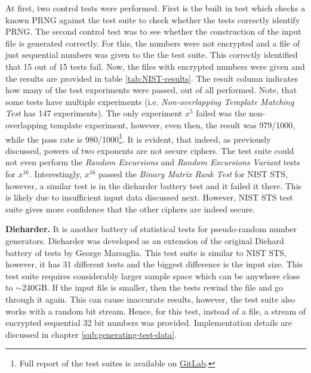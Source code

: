\documentclass{Resources/UoBLab1}
\theoremstyle{definition}
\begin{document}
At first, two control tests were performed. First is the built in test which checks a known PRNG against the test suite to check whether the tests correctly identify PRNG. The second control test was to see whether the construction of the input file is generated correctly. For this, the numbers were not encrypted and a file of just sequential numbers was given to the the test suite. This correctly identified that 15 out of 15 tests fail. Now, the files with encrypted numbers were given and the results are provided in table \ref{tab:NIST-results}. The result column indicates how many of the test experiments were passed, out of all performed. Note, that some tests have multiple experiments (i.e. \textit{Non-overlapping Template Matching Test} has 147 experiments). The only experiment $x^5$ failed was the non-overlapping template experiment, however, even then, the result was 979/1000, while the pass rate is 980/1000\footnote{Full report of the test suites is available on \href{https://git.cs.bham.ac.uk/projects-2023-24/sxt063/-/tree/main/test-suite-results}{GitLab}.}. It is evident, that indeed, as previously discussed, powers of two exponents are not secure ciphers. The test suite could not even perform the \textit{Random Excursions} and \textit{Random Excursions Variant} tests for $x^{16}$. Interestingly, $x^{16}$ passed the \textit{Binary Matrix Rank Test} for NIST STS, however, a similar test is in the dieharder battery test and it failed it there. This is likely due to insufficient input data discussed next. However, NIST STS test suite gives more confidence that the other ciphers are indeed secure.\medskip

\noindent\textbf{Dieharder.} It is another battery of statistical tests for pseudo-random number generators. Dieharder was developed as an extension of the original Diehard battery of tests by George Marsaglia\cite{Diehard}. This test suite is similar to NIST STS, however, it has 31 different tests and the biggest difference is the input size. This test suite requires considerably larger sample space which can be anywhere close to $\sim$240GB. If the input file is smaller, then the tests rewind the file and go through it again. This can cause inaccurate results, however, the test suite also works with a random bit stream. Hence, for this test, instead of a file, a stream of encrypted sequential 32 bit numbers was provided. Implementation details are discussed in chapter \ref{sub:generating-test-data}.
\end{document}
